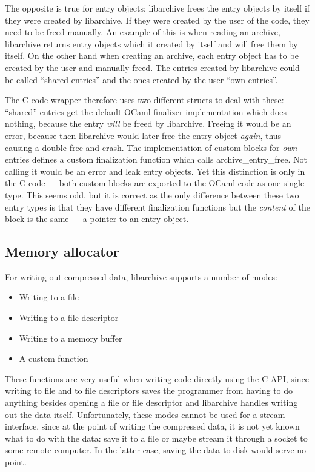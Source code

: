 \documentclass[parskip=half]{scrreprt}
\newcommand\inline[1]{{\addfontfeature{Letters=SmallCaps}#1}}
\begin{document}
The opposite is true for entry objects: libarchive frees the entry objects by
itself if they were created by libarchive. If they were created by the user of
the code, they need to be freed manually. An example of this is when reading an
archive, libarchive returns entry objects which it created by itself and will
free them by itself. On the other hand when creating an archive, each entry
object has to be created by the user and manually freed. The entries created by
libarchive could be called \enquote{shared entries} and the ones created by the
user \enquote{own entries}.

The C code wrapper therefore uses two different structs to deal with these:
\enquote{shared} entries get the default OCaml finalizer implementation which
does nothing, because the entry \emph{will} be freed by libarchive. Freeing it
would be an error, because then libarchive would later free the entry object
\emph{again}, thus causing a double-free and crash. The implementation of
custom blocks for \emph{own} entries defines a custom finalization function
which calls \inline{archive\_entry\_free}. Not calling it would be an error and
leak entry objects. Yet this distinction is only in the C code — both custom
blocks are exported to the OCaml code as one single type. This seems odd, but
it is correct as the only difference between these two entry types is that they
have different finalization functions but the \emph{content} of the block is
the same — a pointer to an entry object.

\subsection{Memory allocator}
\label{sec:allocator}

For writing out compressed data, libarchive supports a number of modes:

\begin{itemize}
  \item Writing to a file
  \item Writing to a file descriptor
  \item Writing to a memory buffer
  \item A custom function
\end{itemize}

These functions are very useful when writing code directly using the C API,
since writing to file and to file descriptors saves the programmer from having
to do anything besides opening a file or file descriptor and libarchive handles
writing out the data itself. Unfortunately, these modes cannot be used for a
stream interface, since at the point of writing the compressed data, it is not
yet known what to do with the data: save it to a file or maybe stream it
through a socket to some remote computer. In the latter case, saving the data
to disk would serve no point.
\end{document}
